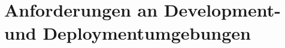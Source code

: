 \chapter{Anforderungen an Development- und Deploymentumgebungen}
\label{ch:04_requirements-for-development-and-deployment-environments}




